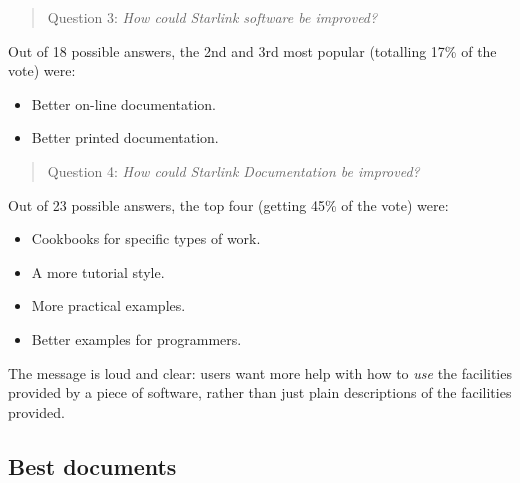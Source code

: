 \documentclass[twoside,11pt]{article}
\begin{document}
\begin{quote}
Question 3: {\em How could Starlink software be improved?}
\end{quote}

Out of 18 possible answers, the 2nd and 3rd most popular (totalling 17\%
of the vote) were:
\begin{itemize}
\item Better on-line documentation.
\item Better printed documentation.
\end{itemize}

\begin{quote}
Question 4: {\em How could Starlink Documentation be improved?}
\end{quote}

Out of 23 possible answers, the top four (getting 45\% of the vote) were:
\begin{itemize}
\item Cookbooks for specific types of work.
\item A more tutorial style.
\item More practical examples.
\item Better examples for programmers.
\end{itemize}

The message is loud and clear: users want more help with how to {\em use}
the facilities provided by a piece of software, rather than just plain
descriptions of the facilities provided.

\subsection{\label{BestDocs}Best documents}
\end{document}
